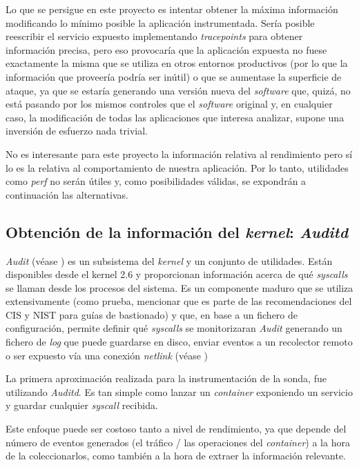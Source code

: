 Lo que se persigue en este proyecto es intentar obtener la máxima información modificando lo mínimo posible la aplicación instrumentada. Sería posible
reescribir el servicio expuesto implementando \emph{tracepoints} para obtener información precisa, pero eso provocaría que la aplicación expuesta no fuese exactamente la misma que se utiliza
en otros entornos productivos (por lo que la información que proveería podría ser inútil) o que se aumentase la superficie de ataque, ya que se estaría
generando una versión nueva del \emph{software} que, quizá, no está pasando por los mismos controles que el \emph{software} original y, en cualquier caso, la modificación de todas las aplicaciones
que interesa analizar, supone una inversión de esfuerzo nada trivial.

No es interesante para este proyecto la información relativa al rendimiento pero sí lo es la relativa al comportamiento de nuestra aplicación. Por lo tanto,
utilidades como \emph{perf} no serán útiles y, como posibilidades válidas, se expondrán a continuación las alternativas.

\subsection{Obtención de la información del \emph{kernel}: \emph{Auditd}}
\label{subsec:auditd}

\emph{Audit} (véase \cite{redhat-auditd}) es un subsistema del \emph{kernel} y un conjunto de utilidades. 
Están disponibles desde el kernel 2.6 y proporcionan información acerca de qué \emph{syscalls}
se llaman desde los procesos del sistema. 
Es un componente maduro que se utiliza extensivamente (como prueba, mencionar que es parte de las recomendaciones del CIS y NIST para guías de bastionado)
y que, en base a un fichero de configuración, permite definir qué \emph{syscalls} se monitorizaran
\emph{Audit} generando un fichero de \emph{log} que puede guardarse en disco, enviar eventos a un recolector remoto o ser expuesto vía una conexión
\emph{netlink} (véase \cite{wiki-netlink})

La primera aproximación realizada para la instrumentación de la sonda, fue utilizando \emph{Auditd}. Es tan simple como lanzar un \emph{container} exponiendo un servicio
y guardar cualquier \emph{syscall} recibida. 

Este enfoque puede ser costoso tanto a nivel de rendimiento, ya que depende del número de eventos generados (el tráfico / las operaciones del \emph{container}) a la hora de la coleccionarlos, como también
a la hora de extraer la información relevante.

